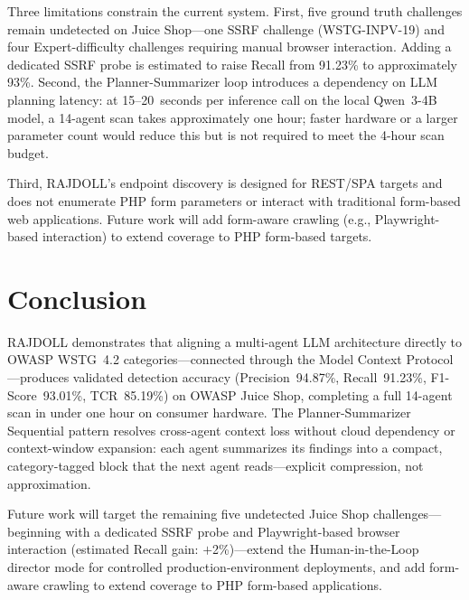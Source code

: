 \documentclass[conference]{IEEEtran}
\begin{document}
Three limitations constrain the current system. First, five
ground truth challenges remain undetected on Juice Shop---one SSRF
challenge (WSTG-INPV-19) and four Expert-difficulty challenges
requiring manual browser interaction. Adding a dedicated SSRF
probe is estimated to raise Recall from 91.23\% to approximately
93\%. Second, the Planner-Summarizer loop introduces a
dependency on LLM planning latency: at 15--20~seconds per
inference call on the local Qwen~3-4B model, a 14-agent scan
takes approximately one hour; faster hardware or a larger
parameter count would reduce this but is not required to meet the
4-hour scan budget.

Third, RAJDOLL's endpoint discovery is designed for REST/SPA targets
and does not enumerate PHP form parameters or interact with
traditional form-based web applications. Future work will add
form-aware crawling (e.g., Playwright-based interaction) to extend
coverage to PHP form-based targets.

\section{Conclusion}

RAJDOLL demonstrates that aligning a multi-agent LLM architecture
directly to OWASP WSTG~4.2 categories---connected through the Model
Context Protocol---produces validated detection accuracy
(Precision~94.87\%, Recall~91.23\%, F1-Score~93.01\%, TCR~85.19\%)
on OWASP Juice Shop, completing a full 14-agent scan in under one hour
on consumer hardware. The Planner-Summarizer Sequential pattern resolves
cross-agent context loss without cloud dependency or context-window
expansion: each agent summarizes its findings into a compact,
category-tagged block that the next agent reads---explicit compression,
not approximation.

Future work will target the remaining five undetected Juice Shop
challenges---beginning with a dedicated SSRF probe and
Playwright-based browser interaction (estimated Recall gain:
$+$2\%)---extend the Human-in-the-Loop director mode for controlled
production-environment deployments, and add form-aware crawling to
extend coverage to PHP form-based applications.
\end{document}
